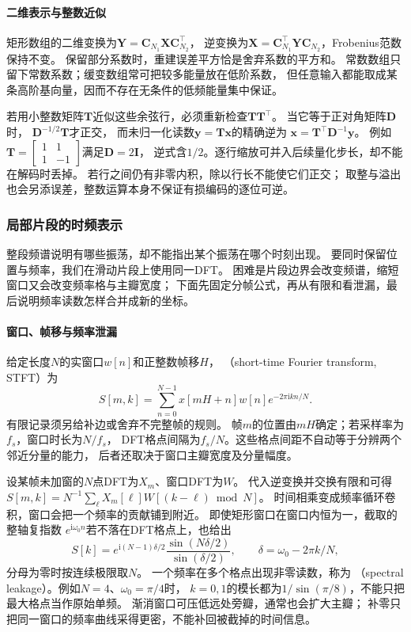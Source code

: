 \paragraph{二维表示与整数近似}
矩形数组的二维变换为$\bm Y=\bm C_{N_1}\bm X\bm C_{N_2}^\top$，
逆变换为$\bm X=\bm C_{N_1}^\top\bm Y\bm C_{N_2}$，Frobenius范数保持不变。
保留部分系数时，重建误差平方恰是舍弃系数的平方和。
常数数组只留下常数系数；缓变数组常可把较多能量放在低阶系数，
但任意输入都能取成某条高阶基向量，因而不存在无条件的低频能量集中保证。

若用小整数矩阵$\bm T$近似这些余弦行，必须重新检查$\bm T\bm T^\top$。
当它等于正对角矩阵$\bm D$时，
$\bm D^{-1/2}\bm T$才正交，
而未归一化读数$\bm y=\bm T\bm x$的精确逆为
$\bm x=\bm T^\top\bm D^{-1}\bm y$。
例如$\bm T=\begin{bmatrix}1&1\\1&-1\end{bmatrix}$满足$\bm D=2\bm I$，
逆式含$1/2$。逐行缩放可并入后续量化步长，却不能在解码时丢掉。
若行之间仍有非零内积，除以行长不能使它们正交；
取整与溢出也会另添误差，整数运算本身不保证有损编码的逐位可逆。

\subsubsection{局部片段的时频表示}
\label{sec:signal-local-frequency}

整段频谱说明有哪些振荡，却不能指出某个振荡在哪个时刻出现。
要同时保留位置与频率，我们在滑动片段上使用同一DFT。
困难是片段边界会改变频谱，缩短窗口又会改变频率格与主瓣宽度；
下面先固定分帧公式，再从有限和看泄漏，最后说明频率读数怎样合并成新的坐标。

\paragraph{窗口、帧移与频率泄漏}
给定长度$N$的实窗口$w[n]$和正整数帧移$H$，
（short-time Fourier transform, STFT）为
\begin{equation}
 S[m,k]=\sum_{n=0}^{N-1}x[mH+n]w[n]e^{-2\pi\mathrm i kn/N}.
 \label{eq:signal-stft}
\end{equation}
有限记录须另给补边或舍弃不完整帧的规则。
帧$m$的位置由$mH$确定；若采样率为$f_s$，窗口时长为$N/f_s$，
DFT格点间隔为$f_s/N$。这些格点间距不自动等于分辨两个邻近分量的能力，
后者还取决于窗口主瓣宽度及分量幅度。

设某帧未加窗的$N$点DFT为$X_m$、窗口DFT为$W$。
代入逆变换并交换有限和可得
$S[m,k]=N^{-1}\sum_\ell X_m[\ell]W[(k-\ell)\bmod N]$。
时间相乘变成频率循环卷积，窗口会把一个频率的贡献铺到附近。
即使矩形窗口在窗口内恒为一，截取的整轴复指数
$e^{\mathrm i\omega_0 n}$若不落在DFT格点上，也给出
\[
 S[k]=e^{\mathrm i(N-1)\delta/2}
 \frac{\sin(N\delta/2)}{\sin(\delta/2)},\qquad
 \delta=\omega_0-2\pi k/N,
\]
分母为零时按连续极限取$N$。
一个频率在多个格点出现非零读数，称为
（spectral leakage）。例如$N=4$、$\omega_0=\pi/4$时，
$k=0,1$的模长都为$1/\sin(\pi/8)$，不能只把最大格点当作原始单频。
渐消窗口可压低远处旁瓣，通常也会扩大主瓣；
补零只把同一窗口的频率曲线采得更密，不能补回被截掉的时间信息。

